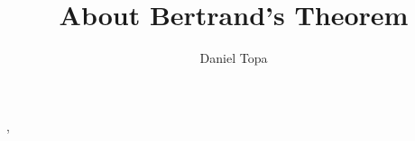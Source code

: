 \documentclass[11pt]{amsart}
\title{About Bertrand's Theorem}
\author{Daniel Topa}
\begin{document}
\maketitle
\cite{leenheer2023comprehensive}
\cite{musgrove2020}, 
\cite{zarmi2002bertrand}
\cite{bertrand1873theoreme}
\cite{santos2007english}
\cite{santos2011english}
\cite{goldstein2eclassical}
\cite{jovanovic2015note}
\cite{chin2015truly}
\cite{galbraith2019even}
\cite{ortega2019proof}
\cite{quilantan1995alternative}
\cite{tu2019pedagogical}
\cite{coursenotes}
\cite{Gerhard}
\clearpage

%
%
\printbibliography
\end{document}
